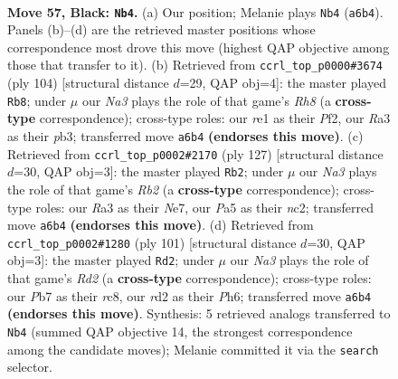 \documentclass[11pt]{article}
\begin{document}
\clearpage

\begin{figure}[p]\centering
\begin{subfigure}{0.46\textwidth}\centering
\resizebox{\linewidth}{!}{%
\newchessgame
\chessboard[
  setfen={1k6/1p5p/n5pP/p4p2/5P2/r7/3R2K1/4R3 b - - 2 57},
  showmover=false,
  pgfstyle=straightmove, color=movearrow, markmove={a6-b4}
]}
\caption{}
\end{subfigure}\hfill
\begin{subfigure}{0.46\textwidth}\centering
\resizebox{\linewidth}{!}{%
\newchessgame
\chessboard[
  setfen={7R/8/8/5p1P/r1k1p3/1p2P1P1/5PK1/8 w - - 2 53},
  showmover=false,
  pgfstyle=straightmove, color=movearrow, markmove={h8-b8}
]}
\caption{}
\end{subfigure}
\\[4pt]
\begin{subfigure}{0.46\textwidth}\centering
\resizebox{\linewidth}{!}{%
\newchessgame
\chessboard[
  setfen={3R4/1r2npk1/4p3/4Pp2/5P1P/8/2NB1K2/8 b - - 20 64},
  showmover=false,
  pgfstyle=straightmove, color=movearrow, markmove={b7-b2}
]}
\caption{}
\end{subfigure}\hfill
\begin{subfigure}{0.46\textwidth}\centering
\resizebox{\linewidth}{!}{%
\newchessgame
\chessboard[
  setfen={2R5/3rk3/1p5p/p5pP/8/1P3P1K/P7/8 b - - 7 51},
  showmover=false,
  pgfstyle=straightmove, color=movearrow, markmove={d7-d2}
]}
\caption{}
\end{subfigure}
\caption{\textbf{Move 57, Black: \texttt{Nb4}.} (a) Our position; Melanie plays \texttt{Nb4} (\texttt{a6b4}). Panels (b)--(d) are the retrieved master positions whose correspondence most drove this move (highest QAP objective among those that transfer to it). (b) Retrieved from \texttt{ccrl\_top\_p0000\#3674} (ply 104) [structural distance $d$=29, QAP obj=4]: the master played \texttt{Rb8}; under $\mu$ our \emph{Na3} plays the role of that game's \emph{Rh8} (a \textbf{cross-type} correspondence); cross-type roles: our \emph{r}e1 as their \emph{P}f2, our \emph{R}a3 as their \emph{p}b3; transferred move \texttt{a6b4} \textbf{(endorses this move)}. (c) Retrieved from \texttt{ccrl\_top\_p0002\#2170} (ply 127) [structural distance $d$=30, QAP obj=3]: the master played \texttt{Rb2}; under $\mu$ our \emph{Na3} plays the role of that game's \emph{Rb2} (a \textbf{cross-type} correspondence); cross-type roles: our \emph{R}a3 as their \emph{N}e7, our \emph{P}a5 as their \emph{n}c2; transferred move \texttt{a6b4} \textbf{(endorses this move)}. (d) Retrieved from \texttt{ccrl\_top\_p0002\#1280} (ply 101) [structural distance $d$=30, QAP obj=3]: the master played \texttt{Rd2}; under $\mu$ our \emph{Na3} plays the role of that game's \emph{Rd2} (a \textbf{cross-type} correspondence); cross-type roles: our \emph{P}b7 as their \emph{r}c8, our \emph{r}d2 as their \emph{P}h6; transferred move \texttt{a6b4} \textbf{(endorses this move)}. Synthesis: 5 retrieved analogs transferred to \texttt{Nb4} (summed QAP objective 14, the strongest correspondence among the candidate moves); Melanie committed it via the \texttt{search} selector.}
\label{fig:thought-m113}
\end{figure}
\end{document}
